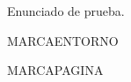 \documentclass{emate-ucr}
\begin{document}
\imprimirtitulo

\begin{ejercicio}[2]
  Enunciado de prueba.
  \begin{solosinsolucionesbloque}
    \mbox{MARCAENTORNO}
  \end{solosinsolucionesbloque}
\end{ejercicio}

\solosinsoluciones{\newpage}

\mbox{MARCAPAGINA}
\end{document}
